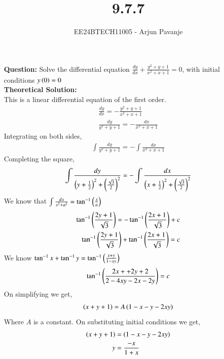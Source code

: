 \documentclass[journal]{IEEEtran}
\begin{document}

\vspace{3cm}

\title{9.7.7}
\author{EE24BTECH11005 - Arjun Pavanje}
{\let\newpage\relax\maketitle}
\textbf{Question:}
Solve the differential equation $\frac{dy}{dx}+\frac{y^2+y+1}{x^2+x+1}=0$, with initial conditions $y\left(0\right) =0$
\solution\\
\textbf{Theoretical Solution:}\\
This is a linear differential equation of the first order.
\begin{align}
  \frac{dy}{dx}= -\frac{y^2+y+1}{x^2+x+1}\\
  \frac{dy}{y^2+y+1}=-\frac{dx}{x^2+x+1}
\end{align}
Integrating on both sides,
\begin{align}
  \int \frac{dy}{y^2+y+1}=-\int \frac{dx}{x^2+x+1}
\end{align}
Completing the square,
\begin{align}
  \int \frac{dy}{\left(y+\frac{1}{2}\right)^2 + \left(\frac{\sqrt{3}}{2}\right)^2}=-\int \frac{dx}{\left(x+\frac{1}{2}\right)^2 + \left(\frac{\sqrt{3}}{2}\right)^2}
\end{align}
We know that $\int \frac{dx}{x^2+a^2}=\tan^{-1}\left(\frac{x}{a}\right)$
\begin{align}
  \tan^{-1}\left(\frac{2y+1}{\sqrt{3}}\right)= -\tan^{-1}\left(\frac{2x+1}{\sqrt{3}}\right)+c\\
  \tan^{-1}\left(\frac{2y+1}{\sqrt{3}}\right)+\tan^{-1}\left(\frac{2x+1}{\sqrt{3}}\right)=c
\end{align}
We know $\tan^{-1}x + \tan^{-1}y = \tan^{-1}\left(\frac{x+y}{1-xy}\right)$
\begin{align}
  \tan^{-1}\left(\frac{2x++2y+2}{2-4xy-2x-2y}\right)=c
\end{align}
On simplifying we get,
\begin{align}
  \left(x+y+1\right)=A\left(1-x-y-2xy\right)
\end{align}
Where $A$ is a constant. On substituting initial conditions we get,
\begin{align}
  \left(x+y+1\right)&=\left(1-x-y-2xy\right)\\
  y&=\frac{-x}{1+x}
\end{align}
\end{document}
